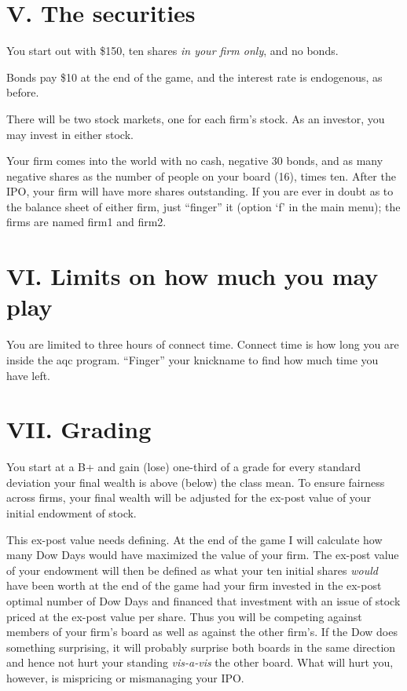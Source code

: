\section{V. The securities}%
You start out with \$150, ten shares {\it in your firm only},
and no bonds.%

Bonds pay \$10 at the end of the game, and the interest rate is
endogenous, as before.

There will be two stock markets, one for each firm's stock.  As an
investor, you may invest in either stock.

Your firm comes into the world with no cash, negative 30 bonds, and
as many negative shares as the number of people on your board (16),
times ten.  After the IPO, your firm will have more shares
outstanding. If you are ever in doubt as to the balance sheet of
either firm, just ``finger'' it (option `f' in the main menu); the
firms are named firm1 and firm2.

\section{VI. Limits on how much you may play}%
You are limited to three hours of connect time.  Connect time is how
long you are inside the aqc program. ``Finger'' your knickname to
find how much time you have left.

\section{VII. Grading}%
You start at a B+ and gain (lose) one-third of a grade for every
standard deviation your final wealth is above (below) the class mean.
To ensure fairness across firms, your final wealth will be adjusted
for the ex-post value of your initial endowment of stock.%

This ex-post value needs defining.  At the end of the game I will
calculate how many Dow Days would have maximized the value of your
firm.  The ex-post value of your endowment will then be defined as
what your ten initial shares {\it would} have been worth at the end
of the game had your firm invested in the ex-post optimal number of
Dow Days and financed that investment with an issue of stock priced
at the ex-post value per share.  Thus you will be competing against
members of your firm's board as well as against the other firm's.  If
the Dow does something surprising, it will probably surprise both
boards in the same direction and hence not hurt your standing {\it
vis-a-vis} the other board.  What will hurt you, however, is
mispricing or mismanaging your IPO.

